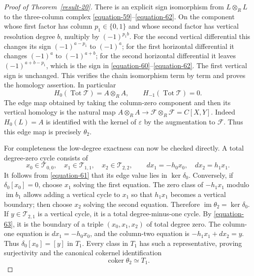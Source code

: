 \documentclass[11pt,a4paper]{article}
\theoremstyle{definition}
\begin{document}
\begin{proof}[Proof of Theorem~\ref{result-20}]
There is an explicit sign isomorphism from $L\otimes_RL$ to the
three-column complex \eqref{equation-59}--\eqref{equation-62}. On the component whose
first factor has column $p_1\in\{0,1\}$ and whose second factor
has vertical resolution degree $b$, multiply by $(-1)^{p_1b}$.
For the second vertical differential this changes its sign
$(-1)^{a-p_1}$ to $(-1)^a$; for the first horizontal differential
it changes $(-1)^a$ to $(-1)^{a+b}$; for the second horizontal
differential it leaves $(-1)^{a+b-p_1}$, which is the sign in
\eqref{equation-60}--\eqref{equation-62}. The first vertical sign is unchanged.
This verifies the chain isomorphism term by term and proves the
homology assertion. In particular
\begin{equation}
                 H_0(\operatorname{Tot}\mathcal T)=A\otimes_RA,
                 \qquad H_{-1}(\operatorname{Tot}\mathcal T)=0.
                                                        \label{equation-63}
\end{equation}
The edge map obtained by taking the column-zero component and
then its vertical homology is the natural map
$A\otimes_RA\to\mathcal F\otimes_R\mathcal F=C[X,Y]$.
Indeed $H_0(L)=A$ is identified with the kernel of $\varepsilon$
by the augmentation to $\mathcal F$. Thus this edge map is
precisely $\theta_2$.

For completeness the low-degree exactness can now be checked
directly. A total degree-zero cycle consists of
\begin{equation}
 x_0\in\mathcal T_{0,0},\quad
 x_1\in\mathcal T_{1,1},\quad
 x_2\in\mathcal T_{2,2},\qquad
             dx_1=-h_0x_0,\quad dx_2=h_1x_1.             \label{equation-64}
\end{equation}
It follows from \eqref{equation-61} that its edge value lies in
$\ker\delta_0$. Conversely, if $\delta_0[x_0]=0$, choose $x_1$
solving the first equation. The zero class of $-h_1x_1$ modulo
$\operatorname{im}b_1$ allows adding a vertical cycle to $x_1$
so that $h_1x_1$ becomes a vertical boundary; then choose $x_2$
solving the second equation. Therefore
$\operatorname{im}\theta_2=\ker\delta_0$.
If $y\in\mathcal T_{2,1}$ is a vertical cycle, it is a total
degree-minus-one cycle. By \eqref{equation-63}, it is the boundary of a
triple $(x_0,x_1,x_2)$ of total degree zero. The column-one
equation is $dx_1=-h_0x_0$, and the column-two equation is
$-h_1x_1+dx_2=y$. Thus $\delta_0[x_0]=[y]$ in $T_1$.
Every class in $T_1$ has such a representative, proving surjectivity
and the canonical cokernel identification
\begin{equation}
                    \operatorname{coker}\theta_2\simeq T_1.
                                                        \label{equation-65}
\end{equation}


\end{proof}
\end{document}

